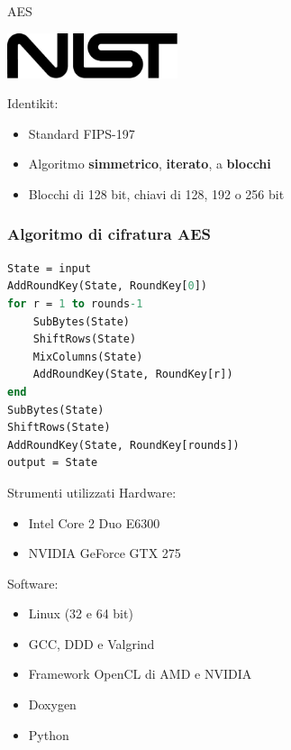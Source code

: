 \documentclass[11pt,xcolor=dvipsnames]{beamer}
\begin{document}
\begin{frame}{AES}
\begin{center}
\includegraphics[width=5cm]{img/nist.pdf}
\end{center}

\vspace{5mm}
Identikit:
\begin{itemize}
\item Standard FIPS-197
\item Algoritmo \textbf{simmetrico}, \textbf{iterato}, a \textbf{blocchi}
\item Blocchi di 128 bit, chiavi di 128, 192 o 256 bit
\end{itemize}
\end{frame}

\begin{frame}[fragile]
\frametitle {Algoritmo di cifratura AES}
\begin{lstlisting}[language=Pascal]
State = input
AddRoundKey(State, RoundKey[0])
for r = 1 to rounds-1
    SubBytes(State)
    ShiftRows(State)
    MixColumns(State)
    AddRoundKey(State, RoundKey[r])
end
SubBytes(State)
ShiftRows(State)
AddRoundKey(State, RoundKey[rounds])
output = State
\end{lstlisting}
\end{frame}

\begin{frame}{Strumenti utilizzati}
Hardware:
\begin{itemize}
\item Intel Core 2 Duo E6300
\item NVIDIA GeForce GTX 275	
\end{itemize}

\vspace{3mm}
Software:
\begin{itemize}
\item Linux (32 e 64 bit)
\item GCC, DDD e Valgrind
\item Framework OpenCL di AMD e NVIDIA
\item Doxygen
\item Python
\end{itemize}

\end{frame}
\end{document}

